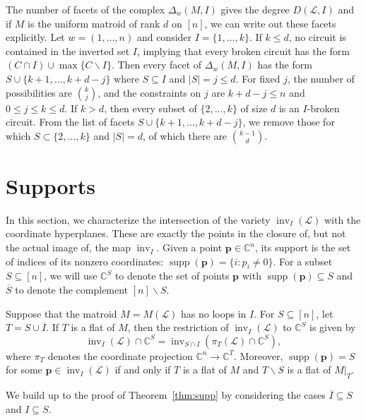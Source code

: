 \documentclass[ALCO,ThmDefs,Unicode,epreuves]{cedram}
\newcommand{\Cbb}{\mathbb{C}}
\newcommand{\cL}{\mathcal{L}}
\newcommand{\p}{\mathbf{p}}
\newcommand{\ol}{\overline}
\DeclareMathOperator{\inv}{inv}
\DeclareMathOperator{\supp}{supp}
\begin{document}
\begin{exam} The number of facets of the complex $\Delta_w(M,I)$ gives the degree $D(\cL,I)$ and if $M$ is the uniform matroid 
of rank $d$ on $[n]$, we can write out these facets explicitly. Let $w = (1,\ldots , n)$ and consider $I = \{1,\ldots , k\}$. 
If $k\leq d$, no circuit is contained in the inverted set $I$, implying that every broken circuit has the form 
$(C\cap I) \cup \max\{C\backslash I\}$. Then every facet of $\Delta_w(M,I)$ has the form $S \cup \{k+1, \ldots , k+d-j\}$ 
where $S\subseteq I$ and $|S| = j \leq d$. For fixed $j$, the number of possibilities are $\binom{k}{j}$, and the
constraints on $j$ are $k+ d - j \leq n$ and $0 \leq j \leq k \leq d$. 
If $k > d$, then every subset of $\{2,\ldots , k\}$ of size $d$ is an $I$-broken circuit. 
From the list of facets $S \cup \{k+1, \ldots , k+d-j\}$, we remove those for which $S\subset \{2,\ldots , k\}$ 
and $|S| = d$, of which there are $\binom{k-1}{d}$. 
\end{exam}





\section{Supports }\label{sec:Supports}
In this section, we characterize the intersection of the variety $\inv_I(\cL)$ with the coordinate hyperplanes. 
These are exactly the points in the closure of, but not the actual image of, the map $\inv_I$. 
Given a point $\p \in \Cbb^n$, its support is the set of indices of its nonzero coordinates: $\supp(\p ) = \{i : p_i \neq 0\}$. 
For a subset $S\subseteq [n]$, we will use $\Cbb^S$ to denote the set of points $\p $ with $\supp(\p ) \subseteq S$
and $\ol{S}$ to denote the complement $[n]\backslash S$. 



\begin{theo} \label{thm:supp}
Suppose that the matroid $M=M(\cL)$ has no loops in $I$.
For $S\subseteq [n]$, let $T = S\cup \ol{I}$. 
If $T$ is a flat of $M$, then the restriction of $\inv_I(\cL)$ to $\Cbb^S$ is given by 
\[
\inv_I(\cL)\cap \Cbb^S  =  \inv_{S\cap I}\left(\pi_{T}(\cL)\cap \Cbb^S\right),
\] 
where $\pi_T$ denotes the coordinate projection $\Cbb^n \rightarrow \Cbb^T$. 
Moreover, $\supp(\p) = S$ for some $\p\in \inv_I(\cL)$ if and only if 
$T$ is a flat of $M$ and $T\backslash S$ is a flat of $M|_T$. 
\end{theo}

We build up to the proof of Theorem~\ref{thm:supp} by considering the cases $\ol{I} \subseteq S$ and 
$I \subseteq S$. 
\end{document}
